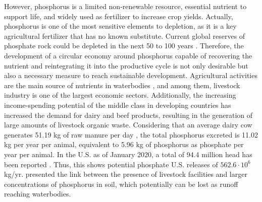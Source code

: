 \begin{refsection}[referencesCh3]
However, phosphorus is a limited non-renewable resource, essential nutrient to support life, and widely used as fertilizer to increase crop yields. Actually, phosphorus is one of the most sensitive elements to depletion, as it is a key agricultural fertilizer that has no known substitute. Current global reserves of phosphate rock could be depleted in the next 50 to 100 years \citep{Cordell}. Therefore, the development of a circular economy around phosphorus capable of recovering the nutrient and reintegrating it into the productive cycle is not only desirable but also a necessary measure to reach sustainable development. Agricultural activities are the main source of nutrients in waterbodies \citep{Dzombak}, and among them, livestock industry is one of the largest economic sectors. Additionally, the increasing income-spending potential of the middle class in developing countries has increased the demand for dairy and beef products, resulting in the generation of large amounts of livestock organic waste. Considering that an average dairy cow generates 51.19 kg of raw manure per day \citep{USDAWaste}, the total phosphorus excreted is 11.02 kg per year per animal, equivalent to 5.96 kg of phosphorus as phosphate per year per animal. In the U.S. as of January 2020, a total of 94.4 million head has been reported \citep{USDACattle2020}. Thus, this shows potential phosphate U.S. releases of $562.6\cdot10^{6}$ kg/yr. \citet{Sampat} presented the link between the presence of livestock facilities and larger concentrations of phosphorus in soil, which potentially can be lost as runoff reaching waterbodies. 

\end{refsection}
